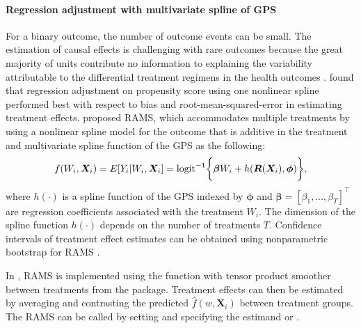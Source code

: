 \paragraph{Regression adjustment with multivariate spline of GPS} 
For a binary outcome, the number of outcome events can be small. The estimation of causal effects is challenging with rare outcomes because the great majority of units contribute no information to explaining the variability attributable to the differential treatment regimens in the health outcomes \citep{hu2021estimation}. \cite{franklin2017comparing} found that regression adjustment on propensity score using one nonlinear spline performed best with respect to bias and root-mean-squared-error in estimating treatment effects. \cite{hu2021estimation} proposed RAMS, which accommodates multiple treatments by using a nonlinear spline model for the outcome that is additive in the treatment and multivariate spline function of the GPS as the following: 
\begin{equation}
f(W_i,\bm{X}_i) =  E[Y_i | W_i, \bm{X}_i]  =  \text{logit}^{-1} \bigg{\{}  \bm{\beta} W_i + h(\bm{R}(\bm{X}_i),\bm{\phi}) \bigg{\}},
\end{equation}
where $h(\cdot)$ is a spline function of the GPS indexed by $\bm{\phi}$ and $\bm{\beta} = [\beta_1, \ldots, \beta_T]^\top$ are regression coefficients associated with the treatment $W_i$. The dimension of the spline function $h(\cdot)$ depends on the number of treatments $T$. Confidence intervals of treatment effect estimates can be obtained using nonparametric bootstrap for RAMS \citep{hu2021estimation}.

In , RAMS is implemented using the  function with tensor product smoother  between treatments from the  package. Treatment effects can then be estimated by averaging and contrasting the predicted $\hat{f}(w,\bm{X}_i)$  between treatment groups. The RAMS can be called by setting  and specifying the estimand  or . 

\begin{Schunk}
\end{Schunk}

